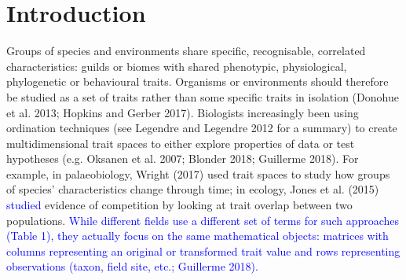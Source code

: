 \documentclass[]{article}
\begin{document}
\section{Introduction}\label{introduction}

Groups of species and environments share specific, recognisable,
correlated characteristics: guilds or biomes with shared phenotypic,
physiological, phylogenetic or behavioural traits. Organisms or
environments should therefore be studied as a set of traits rather than
some specific traits in isolation (Donohue et al. 2013; Hopkins and
Gerber 2017). Biologists increasingly been using ordination techniques
(see Legendre and Legendre 2012 for a summary) to create
multidimensional trait spaces to either explore properties of data or
test hypotheses (e.g. Oksanen et al. 2007; Blonder 2018; Guillerme
2018). For example, in palaeobiology, Wright (2017) used trait spaces to
study how groups of species' characteristics change through time; in
ecology, Jones et al. (2015) \textcolor{blue}{ studied
} evidence of competition by looking at trait overlap between two
populations. \textcolor{blue}{ While different fields
use a different set of terms for such approaches (Table 1), they
actually focus on the same mathematical objects: matrices with columns
representing an original or transformed trait value and rows
representing observations (taxon, field site, etc.; Guillerme 2018). }

\renewcommand\baselinestretch{1}\selectfont
\end{document}
